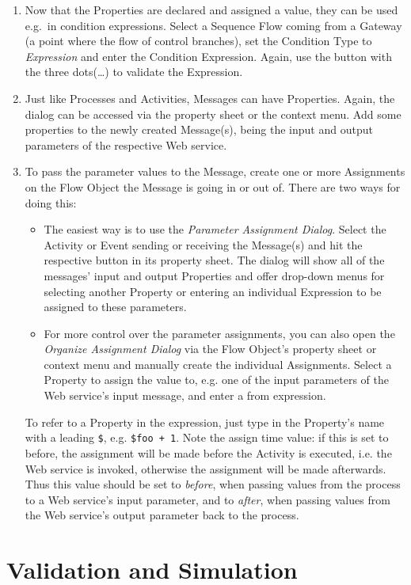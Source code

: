 \begin{enumerate}
	\item Now that the Properties are declared and assigned a value, they can be used e.g.\ in condition expressions.  Select a Sequence Flow coming from a Gateway (a point where the flow of control branches), set the Condition Type to \emph{Expression} and enter the Condition Expression.  Again, use the button with the three dots(\dots) to validate the Expression.
	
	\item Just like Processes and Activities, Messages can have Properties. Again, the dialog can be accessed via the property sheet or the context menu. Add some properties to the newly created Message(s), being the input and output parameters of the respective Web service.
	
	\item To pass the parameter values to the Message, create one or more Assignments on the Flow Object the Message is going in or out of. There are two ways for doing this:
	\begin{itemize}
		\item The easiest way is to use the \emph{Parameter Assignment Dialog}.  Select the Activity or Event sending or receiving the Message(s) and hit the respective button in its property sheet.  The dialog will show all of the messages' input and output Properties and offer drop-down menus for selecting another Property or entering an individual Expression to be assigned to these parameters.
		\item For more control over the parameter assignments, you can also open the \emph{Organize Assignment Dialog} via the Flow Object's property sheet or context menu and manually create the individual Assignments. Select a Property to assign the value to, e.g. one of the input parameters of the Web service's input message, and enter a from expression.
	\end{itemize}
	 To refer to a Property in the expression, just type in the Property's name with a leading \verb|$|, e.g. \verb|$foo + 1|. Note the assign time value: if this is set to before, the assignment will be made before the Activity is executed, i.e. the Web service is invoked, otherwise the assignment will be made afterwards. Thus this value should be set to \emph{before}, when passing values from the process to a Web service's input parameter, and to \emph{after}, when passing values from the Web service's output parameter back to the process.
\end{enumerate}


\section{Validation and Simulation}
\label{sec:user_tut_validation}

